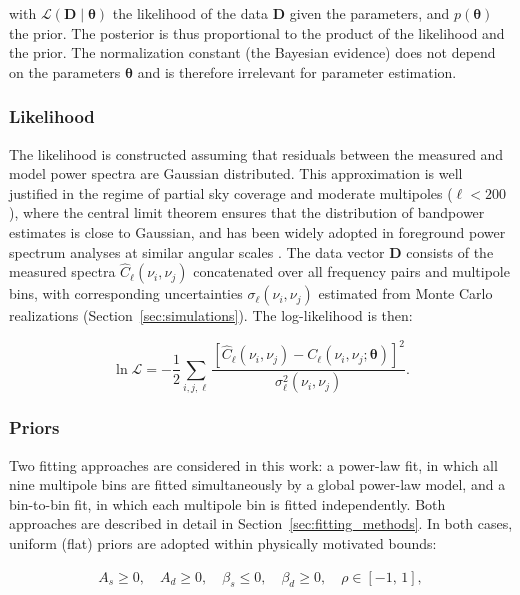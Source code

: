 with $\mathcal{L}(\mathbf{D} \mid \boldsymbol{\theta})$ the likelihood of the data $\mathbf{D}$ given the parameters, and $p(\boldsymbol{\theta})$ the prior. The posterior is thus proportional to the product of the likelihood and the prior. The normalization constant (the Bayesian evidence) does not depend on the parameters $\boldsymbol{\theta}$ and is therefore irrelevant for parameter estimation.



\subsubsection{Likelihood}
\label{sec:likelihood}

The likelihood is constructed assuming that residuals between the measured and model power spectra are Gaussian distributed. This approximation is well justified in the regime of partial sky coverage and moderate multipoles ($\ell < 200$), where the central limit theorem ensures that the distribution of bandpower estimates is close to Gaussian, and has been widely adopted in foreground power spectrum analyses at similar angular scales \citep{Choi_2015, Martire_2022, QUIJOTE_IV}. The data vector $\mathbf{D}$ consists of the measured spectra $\hat{C}_\ell(\nu_i, \nu_j)$ concatenated over all frequency pairs and multipole bins, with corresponding uncertainties $\sigma_\ell(\nu_i, \nu_j)$ estimated from Monte Carlo realizations (Section~\ref{sec:simulations}). The log-likelihood is then:

\begin{equation}
\ln \mathcal{L} = -\frac{1}{2} \sum_{i,j,\ell} \frac{[\hat{C}_\ell(\nu_i, \nu_j) - C_\ell(\nu_i, \nu_j;\boldsymbol{\theta})]^2}{\sigma^2_\ell(\nu_i, \nu_j)}.
\end{equation}

\subsubsection{Priors}
\label{sec:prior}

Two fitting approaches are considered in this work: a power-law fit, in which all nine multipole bins are fitted simultaneously by a global power-law model, and a bin-to-bin fit, in which each multipole bin is fitted independently. Both approaches are described in detail in Section~\ref{sec:fitting_methods}. In both cases, uniform (flat) priors are adopted within physically motivated bounds:

\begin{gather*}
A_s \geq 0, \quad A_d \geq 0, \quad \beta_s \leq 0, \quad \beta_d \geq 0, \quad \rho \in [-1,\, 1],
\end{gather*}

